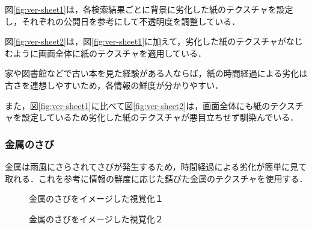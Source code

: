 図\ref{fig:ver-sheet1}は，各検索結果ごとに背景に劣化した紙のテクスチャを設定し，それぞれの公開日を参考にして不透明度を調整している．

図\ref{fig:ver-sheet2}は，図\ref{fig:ver-sheet1}に加えて，劣化した紙のテクスチャがなじむように画面全体に紙のテクスチャを適用している．

家や図書館などで古い本を見た経験がある人ならば，紙の時間経過による劣化は古さを連想しやすいため，各情報の鮮度が分かりやすい．

また，図\ref{fig:ver-sheet1}に比べて図\ref{fig:ver-sheet2}は，画面全体にも紙のテクスチャを設定しているため劣化した紙のテクスチャが悪目立ちせず馴染んでいる．

\subsubsection{金属のさび}
\label{subsec:ver-tex-russet}

金属は雨風にさらされてさびが発生するため，時間経過による劣化が簡単に見て取れる．これを参考に情報の鮮度に応じた錆びた金属のテクスチャを使用する．

\begin{figure}[htbp]
  \begin{minipage}{0.5\hsize}
    \begin{center}
    \end{center}
    \caption{金属のさびをイメージした視覚化１}
    \label{fig:ver-russet1}
  \end{minipage}
  \begin{minipage}{0.5\hsize}
    \begin{center}
    \end{center}
    \caption{金属のさびをイメージした視覚化２}
    \label{fig:ver-russet2}
  \end{minipage}
\end{figure}

